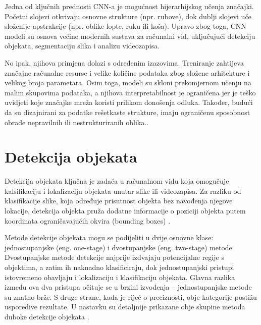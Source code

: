 \documentclass[zavrsnirad]{fer}
\begin{document}
Jedna od ključnih prednosti CNN-a je mogućnost hijerarhijskog učenja značajki. 
Početni slojevi otkrivaju osnovne strukture (npr. rubove), dok dublji slojevi uče složenije apstrakcije (npr. oblike lopte, ruku ili koša). 
Upravo zbog toga, CNN modeli su osnova većine modernih sustava za računalni vid, uključujući detekciju objekata, segmentaciju slika i analizu videozapisa.

No ipak, njihova primjena dolazi s određenim izazovima. 
Treniranje zahtijeva značajne računalne resurse i velike količine podataka zbog složene arhitekture i velikog broja parametara. 
Osim toga, modeli su skloni prekomjernom učenju na malim skupovima podataka, a njihova interpretabilnost je ograničena jer je teško uvidjeti koje značajke mreža koristi prilikom donošenja odluka. 
Također, budući da su dizajnirani za podatke rešetkaste strukture, imaju ograničenu sposobnost obrade nepravilnih ili nestrukturiranih oblika.\cite{Goodfellow-et-al-2016,haque2023cnn}.

\section{Detekcija objekata}
\label{pog:detekcija}
Detekcija objekata ključna je zadaća u računalnom vidu koja omogučuje kalsifikaciju i lokalizaciju objekata unutar slike ili videozapisa.
Za razliku od klasifikacije slike, koja određuje prisutnost objekta bez navođenja njegove lokacije, detekcija objekta pruža dodatne informacije o poziciji objekta putem koordinata ograničavajućih okvira (bounding boxes) \cite{v7labs_yolo_2023}.

Metode detekcije objekata mogu se podijeliti u dvije osnovne klase: jednostupanjske (eng. one-stage) i
dvostupanjske (eng. two-stage) metode.
Dvostupanjske metode detekcije najprije izdvajaju potencijalne regije s objektima, a zatim ih naknadno klasificiraju, dok jednostupanjski pristupi istovremeno obavljaju i lokalizaciju i klasifikaciju objekata. 
Glavna razlika između ova dva pristupa očituje se u brzini izvođenja – jednostupanjske metode su znatno brže. 
S druge strane, kada je riječ o preciznosti, obje kategorije postižu usporedive rezultate. 
U nastavku su detaljnije prikazane obje skupine metoda duboke detekcije objekata \cite{nskturad}.
\end{document}

